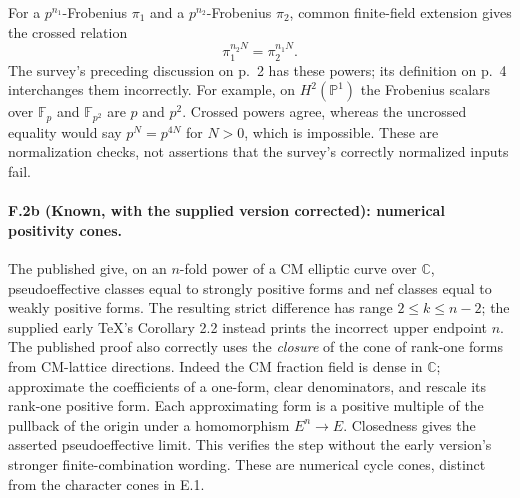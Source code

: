 For a $p^{n_1}$-Frobenius $\pi_1$ and a $p^{n_2}$-Frobenius
$\pi_2$, common finite-field extension gives the crossed relation
\[
                    \pi_1^{n_2N}=\pi_2^{n_1N}.
\]
The survey's preceding discussion on p.~2 has these powers; its
definition on p.~4 interchanges them incorrectly. For example,
on $H^2(\mathbb P^1)$ the Frobenius scalars over $\mathbb F_p$
and $\mathbb F_{p^2}$ are $p$ and $p^2$. Crossed powers agree,
whereas the uncrossed equality would say $p^N=p^{4N}$ for
$N>0$, which is impossible. These are normalization checks,
not assertions that the survey's correctly normalized inputs fail.

\paragraph{F.2b (Known, with the supplied version corrected): numerical positivity cones.}
The published \citet[Theorem 2.1 and Corollary 2.2,
pp.~1799--1801]{rootDELV2011} give, on an $n$-fold power of a
CM elliptic curve over $\mathbb C$, pseudoeffective classes equal to strongly
positive forms and nef classes equal to weakly positive forms.
The resulting strict difference has range $2\le k\le n-2$;
the supplied early TeX's Corollary 2.2 instead prints the
incorrect upper endpoint $n$. The published proof also correctly
uses the \emph{closure} of the cone of rank-one forms from
CM-lattice directions. Indeed the CM fraction field is dense
in $\mathbb C$; approximate the coefficients of a one-form,
clear denominators, and rescale its rank-one positive form.
Each approximating form is a positive multiple of the pullback
of the origin under a homomorphism $E^n\to E$.
Closedness gives the asserted pseudoeffective limit.
This verifies the step without the early version's stronger
finite-combination wording. These are numerical cycle cones,
distinct from the character cones in E.1.

